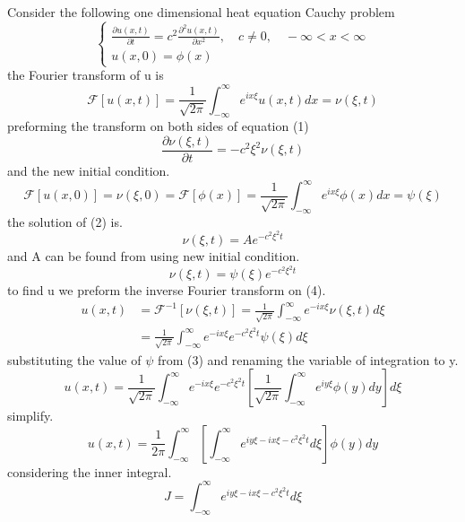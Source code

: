 \documentclass[]{article}
\begin{document}
Consider the following one dimensional heat equation Cauchy problem
\begin{equation}
    \begin{cases}
        \displaystyle \frac{\partial u(x,t)}{\partial t} = c^2\frac{\partial^2 u(x,t)}{\partial x^2}, \quad c \neq 0 , \quad -\infty < x< \infty
        \\
        u(x,0) = \phi (x)
    \end{cases}
\end{equation}
the Fourier transform of u is
\[
    \mathscr{F}[u(x,t)] = \frac{1}{\sqrt{2\pi}}\int_{-\infty}^{\infty}e^{ix\xi}u\left(x,t\right)dx= \nu\left(\xi,t\right)    
\]
preforming the transform on both sides of equation (1)
\begin{equation}
\frac{\partial\nu(\xi,t)}{\partial t} = -c^2 \xi^2 \nu(\xi,t)
\end{equation}
and the new initial condition.
\begin{equation}
\mathscr{F}[u(x,0)] = \nu(\xi,0) =\mathscr{F}[\phi(x)] = \frac{1}{\sqrt{2\pi}}\int_{-\infty}^{\infty}e^{ix\xi}\phi\left(x\right)dx = \psi(\xi)
\end{equation}
the solution of (2) is.
\[
    \nu(\xi,t) = Ae^{-c^2 \xi^2 t}    
\]
and A can be found from using new initial condition. 
\begin{equation}
\nu(\xi,t)= \psi(\xi)e^{-c^2 \xi^2 t}
\end{equation}
to find u we preform the inverse Fourier transform on (4).
\begin{align*}
u(x,t) &= \mathscr{F}^{-1}[\nu(\xi,t)] = \frac{1}{\sqrt{2\pi}}\int_{-\infty}^{\infty}e^{-ix\xi}\nu(\xi,t)d\xi
\\
&= \frac{1}{\sqrt{2\pi}}\int_{-\infty}^{\infty}e^{-ix\xi}e^{-c^2 \xi^2 t}\psi(\xi)d\xi
\end{align*}
substituting the value of $\psi$ from (3) and renaming the variable of integration to y.
\[
    u(x,t) = \frac{1}{\sqrt{2\pi}}\int_{-\infty}^{\infty}e^{-ix\xi}e^{-c^2 \xi^2 t}\left[\frac{1}{\sqrt{2\pi}}\int_{-\infty}^{\infty}e^{iy\xi}\phi\left(y\right)dy\right]d\xi    
\]
simplify.
\begin{equation}
u(x,t) = \frac{1}{2\pi}\int_{-\infty}^{\infty}\left[\int_{-\infty}^{\infty}e^{iy\xi -ix\xi - c^2 \xi^2 t} d\xi \right] \phi(y)dy
\end{equation}
considering the inner integral.
\begin{equation}
J = \int_{-\infty}^{\infty}e^{iy\xi -ix\xi - c^2 \xi^2 t} d\xi
\end{equation}
\end{document}
